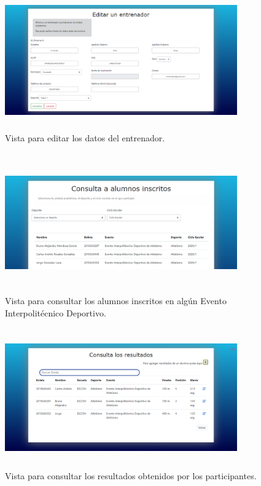 		\begin{figure} [hbt!]
			\centering
			\includegraphics[width=10cm, height=6cm]{Imagenes/Vistas/Vista17_EditarEntrenador}
			\caption{Vista para editar los datos del entrenador.}
			\label{VistaEditarEntrenador}
		\end{figure}
		
		\begin{figure} [hbt!]
			\centering
			\includegraphics[width=10cm, height=6cm]{Imagenes/Vistas/Vista18_ConsultaInscritos}
			\caption{Vista para consultar los alumnos inscritos en algún Evento Interpolitécnico Deportivo.}
			\label{VistaConsultaInscritos}
		\end{figure}
		
		\begin{figure} [hbt!]
			\centering
			\includegraphics[width=10cm, height=6cm]{Imagenes/Vistas/Vista19_ConsultaResultados}
			\caption{Vista para consultar los resultados obtenidos por los participantes.}
			\label{VistaConsultaResultados}
		\end{figure}
		
		
